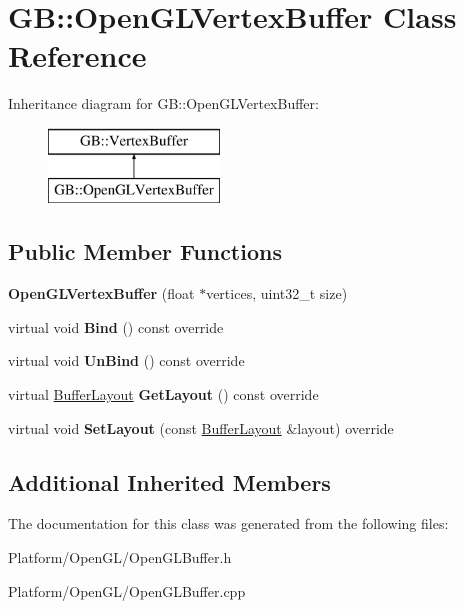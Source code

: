 \hypertarget{class_g_b_1_1_open_g_l_vertex_buffer}{}\section{GB\+::Open\+G\+L\+Vertex\+Buffer Class Reference}
\label{class_g_b_1_1_open_g_l_vertex_buffer}
Inheritance diagram for GB\+::Open\+G\+L\+Vertex\+Buffer\+:\begin{figure}[H]
\begin{center}
\leavevmode
\includegraphics[height=2.000000cm]{class_g_b_1_1_open_g_l_vertex_buffer}
\end{center}
\end{figure}
\subsection*{Public Member Functions}
\begin{DoxyCompactItemize}
\item 
\mbox{\label{class_g_b_1_1_open_g_l_vertex_buffer_a99583d2ca317b62d05d8d998b75b4b96}} 
{\bfseries Open\+G\+L\+Vertex\+Buffer} (float $\ast$vertices, uint32\+\_\+t size)
\item 
\mbox{\label{class_g_b_1_1_open_g_l_vertex_buffer_aadf05f3ed7b3cd647090e298dc2ccecd}} 
virtual void {\bfseries Bind} () const override
\item 
\mbox{\label{class_g_b_1_1_open_g_l_vertex_buffer_a34faa675c7492d5edf0433cce0a9734c}} 
virtual void {\bfseries Un\+Bind} () const override
\item 
\mbox{\label{class_g_b_1_1_open_g_l_vertex_buffer_a48327cc7986f764a74622c755fb2b803}} 
virtual \mbox{\hyperlink{class_g_b_1_1_buffer_layout}{Buffer\+Layout}} {\bfseries Get\+Layout} () const override
\item 
\mbox{\label{class_g_b_1_1_open_g_l_vertex_buffer_afcc5f6bb033b379a4af362a1f05b0506}} 
virtual void {\bfseries Set\+Layout} (const \mbox{\hyperlink{class_g_b_1_1_buffer_layout}{Buffer\+Layout}} \&layout) override
\end{DoxyCompactItemize}
\subsection*{Additional Inherited Members}


The documentation for this class was generated from the following files\+:\begin{DoxyCompactItemize}
\item 
Platform/\+Open\+G\+L/Open\+G\+L\+Buffer.\+h\item 
Platform/\+Open\+G\+L/Open\+G\+L\+Buffer.\+cpp\end{DoxyCompactItemize}
